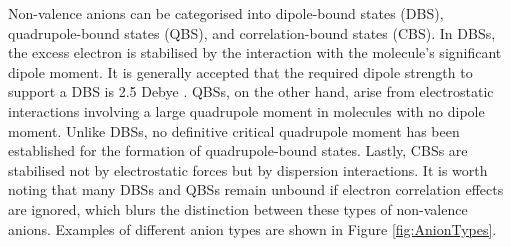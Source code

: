 Non-valence anions can be categorised into dipole-bound states (DBS)\cite{fermi1947capture,desfranccois1996abdoul,gutowski1996contribution,jordan2003theory,qian2019probing}, quadrupole-bound states (QBS)\cite{jordan1979binding,desfranccois2004long,sommerfeld2014excess}, and correlation-bound states (CBS)\cite{sommerfeld2010correlation,voora2013existence,voora2014nonvalence,voora2017theoretical}.
In DBSs, the excess electron is stabilised by the interaction with the molecule's significant dipole moment. It is generally accepted that the required dipole strength to support a DBS is 2.5 Debye \cite{jordan2003theory}. QBSs, on the other hand, arise from electrostatic interactions involving a large quadrupole moment in molecules with no dipole moment. Unlike DBSs, no definitive critical quadrupole moment has been established for the formation of quadrupole-bound states\cite{sommerfeld2014excess}. Lastly, CBSs are stabilised not by electrostatic forces but by dispersion interactions. It is worth noting that many DBSs and QBSs remain unbound if electron correlation effects are ignored, which blurs the distinction between these types of non-valence anions\cite{voora2017theoretical}. Examples of different anion types are shown in Figure \ref{fig:AnionTypes}.

